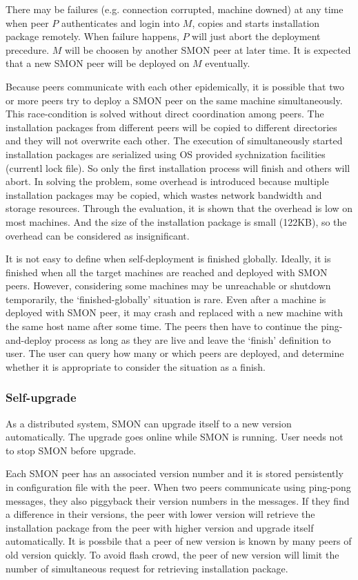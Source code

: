 There may be failures (e.g. connection corrupted, machine
downed) at any time when peer $P$ authenticates and login
into $M$, copies and starts installation package remotely.
When failure happens, $P$ will just abort the deployment
precedure. $M$ will be choosen by another SMON peer at later
time. It is expected that a new SMON peer will be deployed
on $M$ eventually.

Because peers communicate with each other epidemically, it
is possible that two or more peers try to deploy a SMON peer
on the same machine simultaneously. This race-condition is
solved without direct coordination among peers. The
installation packages from different peers will be copied to
different directories and they will not overwrite each
other. The execution of simultaneously started installation
packages are serialized using OS provided sychnization
facilities (currentl lock file). So only the first
installation process will finish and others will abort. In
solving the problem, some overhead is introduced because
multiple installation packages may be copied, which wastes
network bandwidth and storage resources. Through the
evaluation, it is shown that the overhead is low on most
machines. And the size of the installation package is small
(122KB), so the overhead can be considered as insignificant.

It is not easy to define when self-deployment is finished
globally. Ideally, it is finished when all the target
machines are reached and deployed with SMON peers.  However,
considering some machines may be unreachable or shutdown
temporarily, the `finished-globally' situation is rare. Even
after a machine is deployed with SMON peer, it may crash and
replaced with a new machine with the same host name after
some time. The peers then have to continue the
ping-and-deploy process as long as they are live and leave
the `finish' definition to user. The user can query how many
or which peers are deployed, and determine whether it is
appropriate to consider the situation as a finish.

\subsubsection*{Self-upgrade}

As a distributed system, SMON can upgrade itself to a new
version automatically. The upgrade goes online while SMON is
running. User needs not to stop SMON before upgrade.

Each SMON peer has an associated version number and it is
stored persistently in configuration file with the peer.
When two peers communicate using ping-pong messages, they
also piggyback their version numbers in the messages.  If
they find a difference in their versions, the peer with
lower version will retrieve the installation package from
the peer with higher version and upgrade itself
automatically.  It is possbile that a peer of new version is
known by many peers of old version quickly. To avoid flash
crowd, the peer of new version will limit the number of
simultaneous request for retrieving installation package.

